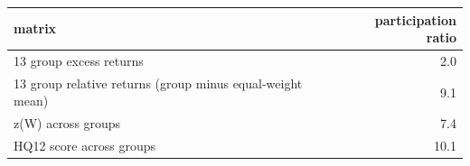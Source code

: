 \begin{tabular}{lr}
\toprule
matrix & participation ratio \\
\midrule
13 group excess returns & 2.0 \\
13 group relative returns (group minus equal-weight mean) & 9.1 \\
z(W) across groups & 7.4 \\
HQ12 score across groups & 10.1 \\
\bottomrule
\end{tabular}
